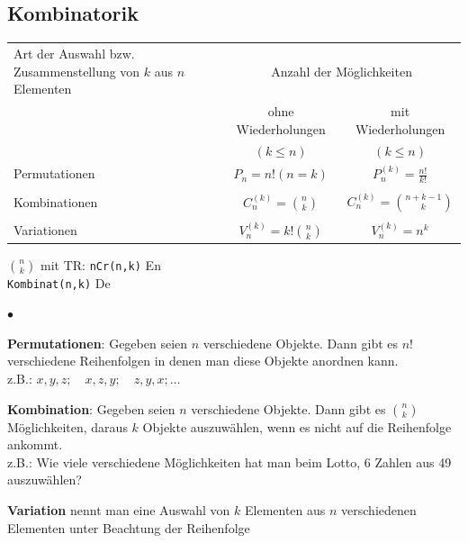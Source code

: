 	\subsection{Kombinatorik }
		\begin{minipage}{13.5cm}
		\begin{tabular}{| p{5.5cm} | c | c |}
			\hline
			Art der Auswahl bzw. Zusammenstellung von $k$ aus $n$ Elementen
			& \multicolumn{2}{c|}{Anzahl der Möglichkeiten}\\
 			& ohne Wiederholungen		& mit Wiederholungen\\
 			& $(k\leq n)$ 				& $(k\leq n)$ \\
 			\hline
 			Permutationen & $P_n=n!(n=k)$ &
 			$P_n^{(k)}=\frac{n!}{k!}$ \\ & &\\
 			Kombinationen & $C_n^{(k)}=\binom n k$ &
 			$C_n^{(k)}=\binom{n+k-1} k$\\
 			& &\\
 			Variationen & $V_n^{(k)}=k!\binom n k$ & $V_n^{(k)}=n^k$\\
 			\hline
		\end{tabular}
		\end{minipage}
		\begin{minipage}{5cm}
		$\binom n k$ mit TR: \texttt{nCr(n,k)} \hspace{9.3mm}En\\
		\hspace*{19mm} \texttt{Kombinat(n,k)} De
		\end{minipage}
		\begin{list}{$\bullet$}{\setlength{\itemsep}{0cm} \setlength{\parsep}{0cm} \setlength{\topsep}{0.1cm}} 
         	\item \textbf{Permutationen}: Gegeben seien $n$ verschiedene Objekte. Dann gibt es $n!$
         	verschiedene Reihenfolgen in denen man diese Objekte anordnen
         	kann. \\
         	z.B.: $x,y,z;\quad x,z,y;\quad z,y,x;\ldots$
		 	\item \textbf{Kombination}: Gegeben seien $n$ verschiedene Objekte. Dann gibt es $\binom n k$
		 	Möglichkeiten, daraus $k$ Objekte auszuwählen, wenn es nicht auf die Reihenfolge
		 	ankommt. \\
		 	z.B.: Wie viele verschiedene Möglichkeiten hat man beim Lotto, 6 Zahlen aus 49
		 	auszuwählen?
		  \item \textbf{Variation} nennt man eine Auswahl von $k$ Elementen aus $n$
		  		verschiedenen Elementen unter Beachtung der Reihenfolge
        \end{list}
        
